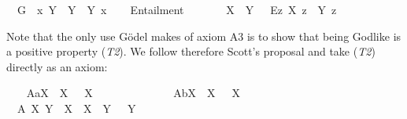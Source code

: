 \begin{isabellebody}
\ \ {\isachardoublequoteopen}G{\isacharasterisk}\ {\isasymequiv}\ {\isacharparenleft}{\isasymlambda}x{\isachardot}\ \isactrlbold {\isasymforall}Y{\isachardot}\ {\isasymP}\ Y\ \isactrlbold {\isasymleftrightarrow}\ Y\ x{\isacharparenright}{\isachardoublequoteclose}\isanewline
\ \ \isanewline
{}\isamarkupfalse%
\ Entailment{\isacharcolon}{\isacharcolon}{\isachardoublequoteopen}{\isasymup}{\isasymlangle}{\isasymup}{\isasymlangle}{\isasymzero}{\isasymrangle}{\isacharcomma}{\isasymup}{\isasymlangle}{\isasymzero}{\isasymrangle}{\isasymrangle}{\isachardoublequoteclose}\ {\isacharparenleft}\ {\isachardoublequoteopen}{\isasymRrightarrow}{\isachardoublequoteclose}\ {}{}{\isacharparenright}\ \ \isanewline
\ \ {\isachardoublequoteopen}X\ {\isasymRrightarrow}\ Y\ {\isasymequiv}\ \ \isactrlbold {\isasymbox}{\isacharparenleft}\isactrlbold {\isasymforall}\isactrlsup Ez{\isachardot}\ X\ z\ \isactrlbold {\isasymrightarrow}\ Y\ z{\isacharparenright}{\isachardoublequoteclose}%
\isamarkuptrue%
%
\begin{isamarkuptext}%
Note that the only use G\"odel makes of axiom A3 is to show that being Godlike is a positive property (\emph{T2}). 
 We follow therefore Scott's proposal and take (\emph{T2}) directly as an axiom:%
\end{isamarkuptext}\isamarkuptrue%
\isamarkupfalse%
\ \isanewline
\ \ A{}a{\isacharcolon}{\isachardoublequoteopen}{\isasymlfloor}\isactrlbold {\isasymforall}X{\isachardot}\ {\isasymP}\ {\isacharparenleft}\isactrlbold {\isasymrightharpoondown}X{\isacharparenright}\ \isactrlbold {\isasymrightarrow}\ \isactrlbold {\isasymnot}{\isacharparenleft}{\isasymP}\ X{\isacharparenright}\ {\isasymrfloor}{\isachardoublequoteclose}\ \ \ \ \ \ \ \ \ \ \ %
\isanewline
\ \ A{}b{\isacharcolon}{\isachardoublequoteopen}{\isasymlfloor}\isactrlbold {\isasymforall}X{\isachardot}\ \isactrlbold {\isasymnot}{\isacharparenleft}{\isasymP}\ X{\isacharparenright}\ \isactrlbold {\isasymrightarrow}\ {\isasymP}\ {\isacharparenleft}\isactrlbold {\isasymrightharpoondown}X{\isacharparenright}{\isasymrfloor}{\isachardoublequoteclose}\ \ \ \ \ \ \ \ \ \ \ \ %
\isanewline
\ \ A{}{\isacharcolon}\ {\isachardoublequoteopen}{\isasymlfloor}\isactrlbold {\isasymforall}X\ Y{\isachardot}\ {\isacharparenleft}{\isasymP}\ X\ \isactrlbold {\isasymand}\ {\isacharparenleft}X\ {\isasymRrightarrow}\ Y{\isacharparenright}{\isacharparenright}\ \isactrlbold {\isasymrightarrow}\ {\isasymP}\ Y{\isasymrfloor}{\isachardoublequoteclose}\ \ \ \ \ %

\end{isabellebody}
